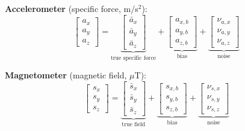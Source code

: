 \documentclass[12pt, a4paper]{article}
\begin{document}
\textbf{Accelerometer} (specific force, m/s$^2$):
\[
  \begin{bmatrix} a_x \\ a_y \\ a_z \end{bmatrix}
  =
  \underbrace{\begin{bmatrix} \bar{a}_x \\ \bar{a}_y \\ \bar{a}_z \end{bmatrix}}_{\text{true specific force}}
  +
  \underbrace{\begin{bmatrix} a_{x,b} \\ a_{y,b} \\ a_{z,b} \end{bmatrix}}_{\text{bias}}
  +
  \underbrace{\begin{bmatrix} \nu_{a,x} \\ \nu_{a,y} \\ \nu_{a,z} \end{bmatrix}}_{\text{noise}}
\]

\textbf{Magnetometer} (magnetic field, $\mu$T):
\[
  \begin{bmatrix} s_x \\ s_y \\ s_z \end{bmatrix}
  =
  \underbrace{\begin{bmatrix} \bar{s}_x \\ \bar{s}_y \\ \bar{s}_z \end{bmatrix}}_{\text{true field}}
  +
  \underbrace{\begin{bmatrix} s_{x,b} \\ s_{y,b} \\ s_{z,b} \end{bmatrix}}_{\text{bias}}
  +
  \underbrace{\begin{bmatrix} \nu_{s,x} \\ \nu_{s,y} \\ \nu_{s,z} \end{bmatrix}}_{\text{noise}}
\]
\end{document}
